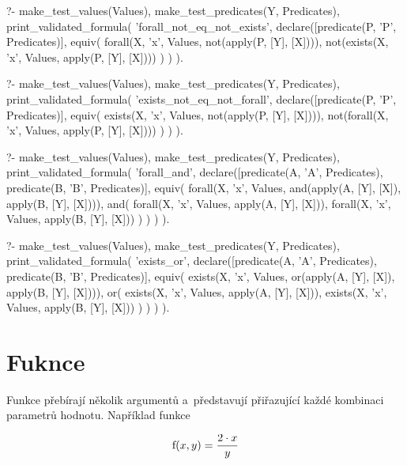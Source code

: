 \begin{fact}
\begin{prolog}
?- 	make_test_values(Values),
	make_test_predicates(Y, Predicates),
	print_validated_formula(
		'forall_not_eq_not_exists',
		declare([predicate(P, 'P', Predicates)],
			equiv(
				forall(X, 'x', Values, not(apply(P, [Y], [X]))),
				not(exists(X, 'x', Values, apply(P, [Y], [X])))
			)
		)
	).
\end{prolog}
\begin{prolog}
?- 	make_test_values(Values), make_test_predicates(Y, Predicates),
	print_validated_formula(
		'exists_not_eq_not_forall',
		declare([predicate(P, 'P', Predicates)],
			equiv(
				exists(X, 'x', Values, not(apply(P, [Y], [X]))),
				not(forall(X, 'x', Values, apply(P, [Y], [X])))
			)
		)
	).
\end{prolog}
\begin{prolog}
?- 	make_test_values(Values),
	make_test_predicates(Y, Predicates),
	print_validated_formula(
		'forall_and',
		declare([predicate(A, 'A', Predicates), predicate(B, 'B', Predicates)],
			equiv(
				forall(X, 'x', Values, and(apply(A, [Y], [X]), apply(B, [Y], [X]))),
				and(
					forall(X, 'x', Values, apply(A, [Y], [X])),
					forall(X, 'x', Values, apply(B, [Y], [X]))
				)
			)
		)
	).
\end{prolog}
\begin{prolog}
?- 	make_test_values(Values),
	make_test_predicates(Y, Predicates),
	print_validated_formula(
		'exists_or',
		declare([predicate(A, 'A', Predicates), predicate(B, 'B', Predicates)],
			equiv(
				exists(X, 'x', Values, or(apply(A, [Y], [X]), apply(B, [Y], [X]))),
				or(
					exists(X, 'x', Values, apply(A, [Y], [X])),
					exists(X, 'x', Values, apply(B, [Y], [X]))
				)
			)
		)
	).
\end{prolog}
\end{fact}

\section{Fuknce}

Funkce přebírají několik argumentů a~představují  přiřazující každé kombinaci parametrů hodnotu. Například funkce

\begin{equation}
\label{eq:example_function}
\mathrm{f}(x, y) = \frac{2 \cdot x}{y}
\end{equation} 

